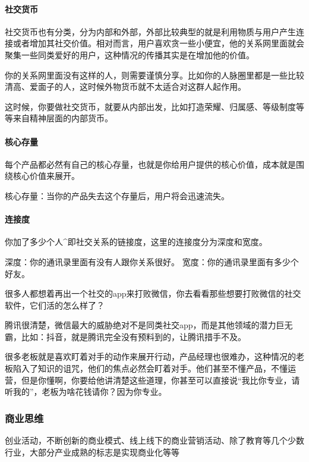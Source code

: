 \documentclass[letterpaper,11pt,english]{sphinxmanual}
\begin{document}
\paragraph{社交货币}
\label{\detokenize{chapter_idea/convert:id2}}
社交货币也有分类，分为内部和外部，外部比较典型的就是利用物质与用户产生连接或者增加其社交价值。相对而言，用户喜欢贪一些小便宜，他的关系网里面就会聚集一些同类爱好的用户，这种情况的传播其实是在增加他的价值。

你的关系网里面没有这样的人，则需要谨慎分享。比如你的人脉圈里都是一些比较清高、爱面子的人，这时候外物货币就不太适合对这群人起作用。

这时候，你要做社交货币，就要从内部出发，比如打造荣耀、归属感、等级制度等等来自精神层面的内部货币。


\paragraph{核心存量}
\label{\detokenize{chapter_idea/convert:id3}}
每个产品都必然有自己的核心存量，也就是你给用户提供的核心价值，成本就是围绕核心价值来展开。

核心存量：当你的产品失去这个存量后，用户将会迅速流失。


\paragraph{连接度}
\label{\detokenize{chapter_idea/convert:id4}}
你加了多少个人\textasciicircum{}即社交关系的链接度，这里的连接度分为深度和宽度。

深度：你的通讯录里面有没有人跟你关系很好。
宽度：你的通讯录里面有多少个好友。

很多人都想着再出一个社交的app来打败微信，你去看看那些想要打败微信的社交软件，它们活的怎么样了？

腾讯很清楚，微信最大的威胁绝对不是同类社交app，而是其他领域的潜力巨无霸，比如：抖音，就是腾讯完全没有预料到的，让腾讯措手不及。

很多老板就是喜欢盯着对手的动作来展开行动，产品经理也很难办，这种情况的老板陷入了知识的诅咒，他们的焦点必然会盯着对手。他们甚至不懂产品，不懂运营，但是你懂啊，你要给他讲清楚这些道理，你甚至可以直接说“我比你专业，请听我的”，老板为啥花钱请你？因为你专业。


\subsubsection{商业思维}
\label{\detokenize{chapter_idea/business:id1}}\label{\detokenize{chapter_idea/business::doc}}
创业活动，不断创新的商业模式、线上线下的商业营销活动、除了教育等几个少数行业，大部分产业成熟的标志是实现商业化等等
\end{document}
